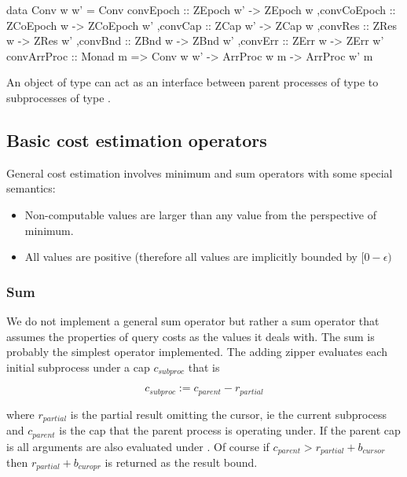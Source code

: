 \begin{code}
\begin{haskellcode}
data Conv w w' =
  Conv
  { convEpoch :: ZEpoch w' -> ZEpoch w
   ,convCoEpoch :: ZCoEpoch w -> ZCoEpoch w'
   ,convCap :: ZCap w' -> ZCap w
   ,convRes :: ZRes w -> ZRes w'
   ,convBnd :: ZBnd w -> ZBnd w'
   ,convErr :: ZErr w -> ZErr w'
  }
convArrProc :: Monad m => Conv w w' -> ArrProc w m -> ArrProc w' m
\end{haskellcode}
  \caption{\label{lst:conv_def}An object of type  can
    act as an interface between parent processes of type  to
    subprocesses of type .}
\end{code}


\subsection{Basic cost estimation operators}
\label{sec:basic_cost_ops}

General cost estimation involves minimum and sum operators with some
special semantics:

\begin{itemize}
\item Non-computable values are larger than any value from the
  perspective of minimum.
\item All values are positive (therefore all values are implicitly
  bounded by \([0 - \epsilon)\)
\end{itemize}

\subsubsection{Sum}

We do not implement a general sum operator but rather a sum operator
that assumes the properties of query costs as the values it deals
with. The sum is probably the simplest operator implemented. The
adding zipper evaluates each initial subprocess under a cap
\(c_{subproc}\) that is

\[
c_{subproc} := c_{parent} - r_{partial}
\]

where \(r_{partial}\) is the partial result omitting the cursor, ie
the current subprocess and \(c_{parent}\) is the cap that the parent
process is operating under. If the parent cap is  all
arguments are also evaluated under . Of course if
\(c_{parent} > r_{partial} + b_{cursor}\) then \(r_{partial} +
b_{curopr}\) is returned as the result bound.

